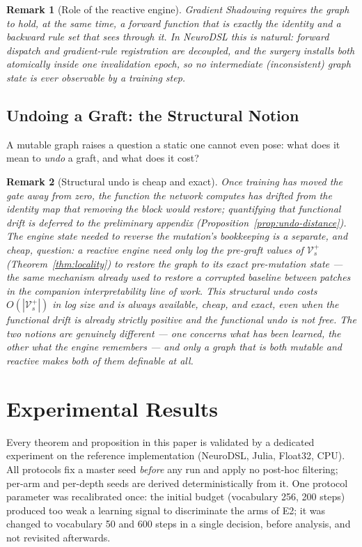 \documentclass[11pt,a4paper]{article}
\newtheorem{remark}{Remark}
\newcommand{\V}{\mathcal{V}}
\begin{document}
\begin{remark}[Role of the reactive engine]
Gradient Shadowing requires the graph to hold, at the same time, a forward function that is exactly the identity and a backward rule set that sees through it. In NeuroDSL this is natural: forward dispatch and gradient-rule registration are decoupled, and the surgery installs both atomically inside one invalidation epoch, so no intermediate (inconsistent) graph state is ever observable by a training step.
\end{remark}

\subsection{Undoing a Graft: the Structural Notion}
\label{sec:undo}

A mutable graph raises a question a static one cannot even pose: what does it mean to \emph{undo} a graft, and what does it cost?

\begin{remark}[Structural undo is cheap and exact]
\label{rem:structural-undo}
Once training has moved the gate away from zero, the \emph{function} the network computes has drifted from the identity map that removing the block would restore; quantifying that functional drift is deferred to the preliminary appendix (Proposition~\ref{prop:undo-distance}). The \emph{engine state} needed to reverse the mutation's bookkeeping is a separate, and cheap, question: a reactive engine need only log the pre-graft values of $\V_s^+$ (Theorem~\ref{thm:locality}) to restore the graph to its exact pre-mutation state --- the same mechanism already used to restore a corrupted baseline between patches in the companion interpretability line of work. This \emph{structural} undo costs $O(|\V_s^+|)$ in log size and is always available, cheap, and exact, even when the functional drift is already strictly positive and the \emph{functional} undo is not free. The two notions are genuinely different --- one concerns what has been learned, the other what the engine remembers --- and only a graph that is both mutable and reactive makes both of them definable at all.
\end{remark}

\section{Experimental Results}
\label{sec:experiments}

Every theorem and proposition in this paper is validated by a dedicated experiment on the reference implementation (NeuroDSL, Julia, Float32, CPU). All protocols fix a master seed \emph{before} any run and apply no post-hoc filtering; per-arm and per-depth seeds are derived deterministically from it. One protocol parameter was recalibrated once: the initial budget (vocabulary 256, 200 steps) produced too weak a learning signal to discriminate the arms of E2; it was changed to vocabulary 50 and 600 steps in a single decision, before analysis, and not revisited afterwards.
\end{document}
